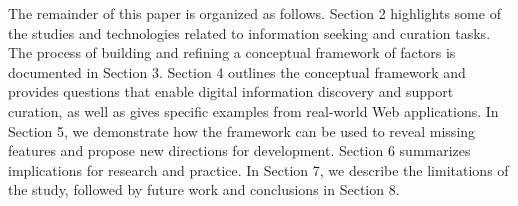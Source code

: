 The remainder of this paper is organized as follows. Section 2 highlights some of the studies and technologies related to information seeking and curation tasks. The process of building and refining a conceptual framework of factors is documented in Section 3. Section 4 outlines the conceptual framework and provides questions that enable digital information discovery and support curation, as well as gives specific examples from real-world Web applications. In Section 5, we demonstrate how the framework can be used to reveal missing features and propose new directions for development. Section 6 summarizes implications for research and practice. In Section 7, we describe the limitations of the study, followed by future work and conclusions in Section 8.